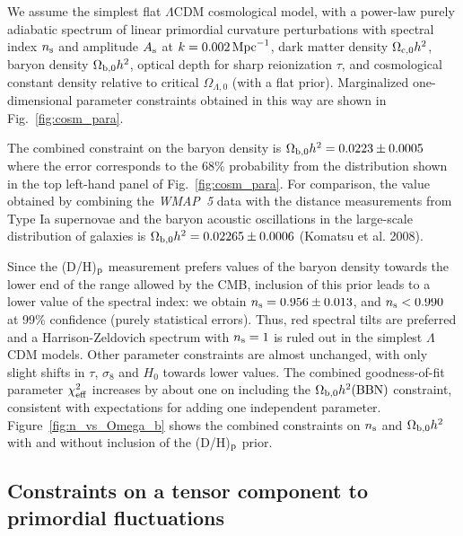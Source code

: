 \documentclass[useAMS,usenatbib]{mn2e}
\begin{document}
We assume the simplest flat $\Lambda$CDM cosmological model,
with a power-law purely adiabatic spectrum 
of linear primordial curvature perturbations
with spectral index $n_{\rm s}$ and 
amplitude $A_{\rm s}$ at $k=0.002\,{\rm Mpc}^{-1}$,
dark matter density $\Omega_{\rm c, 0} h^2$,
baryon density $\Omega_{\rm b, 0} h^2$,
optical depth for sharp reionization $\tau$, and
cosmological constant density relative to 
critical $\Omega_{\Lambda, 0}$ (with a flat prior).
Marginalized one-dimensional parameter constraints obtained in this
way are shown in Fig.~\ref{fig:cosm_para}.

The combined constraint on the baryon density is
$\Omega_{\rm b,0} h^2 = 0.0223 \pm 0.0005$
where the error corresponds to the 68\% probability
from the distribution shown in the top left-hand panel
of Fig.~\ref{fig:cosm_para}.
For comparison, the value obtained by
combining the \textit{WMAP~5} data
with the distance measurements from Type Ia supernovae
and the baryon acoustic oscillations in the large-scale
distribution of galaxies is
$\Omega_{\rm b,0} h^2 = 0.02265 \pm 0.0006$
(Komatsu et al. 2008).

Since the (D/H)$_{\rm p}$ measurement prefers values of the baryon density
towards the lower end of the range allowed by the CMB,
inclusion of this prior leads to a lower value of the spectral index:
we obtain $n_{\rm s} =0.956\pm 0.013$, and
$n_{\rm s}< 0.990$ at 99\% confidence (purely statistical errors).
Thus, red spectral tilts are preferred and
a Harrison-Zeldovich spectrum with $n_{\rm s}=1$
is ruled out in the simplest $\Lambda$CDM models.
Other parameter constraints are almost unchanged,
with only slight shifts in $\tau$, $\sigma_8$ and $H_0$ towards lower values.
The combined goodness-of-fit parameter $\chi^2_{\rm eff}$
increases by about one on including the $\Omega_{\rm b,0} h^2 {\rm (BBN)}$ constraint,
consistent with expectations for adding one
independent parameter.
Figure~\ref{fig:n_vs_Omega_b} shows the combined constraints
on $n_{\rm s}$ and $\Omega_{\rm b,0} h^2$ with and without 
inclusion of the (D/H)$_{\rm p}$ prior.


\subsection{Constraints on a tensor component to primordial fluctuations}
\label{sec:BBN_and_CMB_tensors}
\end{document}
